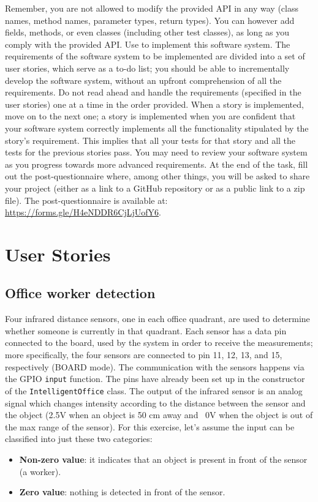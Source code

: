 Remember, you are not allowed to modify the provided API in any way (\ie class names, method names, parameter types, return types). You can however add fields, methods, or even classes (including other test classes), as long as you comply with the provided API. Use \tdd to implement this software system.
The requirements of the software system to be implemented are divided into a set of user stories, which serve as a to-do list; you should be able to incrementally develop the software system, without an upfront comprehension of all the requirements. Do not read ahead and handle the requirements (\ie specified in the user stories) one at a time in the order provided.
When a story is implemented, move on to the next one; a story is implemented when you are confident that your software system correctly implements all the functionality stipulated by the story's requirement. This implies that all your tests for that story and all the tests for the previous stories pass. You may need to review your software system as you progress towards more advanced requirements.
At the end of the task, fill out the post-questionnaire where, among other things, you will be asked to share your project (either as a link to a GitHub repository or as a public link to a zip file). The post-questionnaire is available at: \url{https://forms.gle/H4eNDDR6CjLjUofY6}.


\section{User Stories}
\subsection{Office worker detection}
Four infrared distance sensors, one in each office quadrant, are used to determine whether someone is currently in that quadrant.
Each sensor has a data pin connected to the board, used by the system in order to receive the measurements; more specifically, the four sensors are connected to pin 11, 12, 13, and 15, respectively (BOARD mode).
The communication with the sensors happens via the GPIO \texttt{input} function. The pins have already been set up in the constructor of the \texttt{IntelligentOffice} class. 
The output of the infrared sensor is an analog signal which changes intensity according to the distance between the sensor and the object (\ie 2.5V when an object is 50 cm away and ~0V when the object is out of the max range of the sensor). For this exercise, let's assume the input can be classified into just these two categories:
\begin{itemize}
    \item \textbf{Non-zero value}: it indicates that an object is present in front of the sensor (\ie a worker).
    \item \textbf{Zero value}: nothing is detected in front of the sensor.
\end{itemize}

